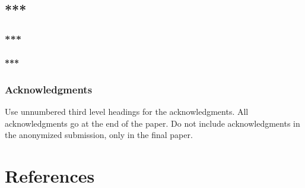 \documentclass{article}
\theoremstyle{remark}
\theoremstyle{innote}
\renewcommand*{\|}{\mathpunct{|}}%
\theoremstyle{simple}
\begin{document}
\subsection{***}


\subsubsection{***}


\paragraph{***}



\subsubsection*{Acknowledgments}

Use unnumbered third level headings for the acknowledgments. All
acknowledgments go at the end of the paper. Do not include
acknowledgments in the anonymized submission, only in the final paper.

\section*{References}





\end{document}
